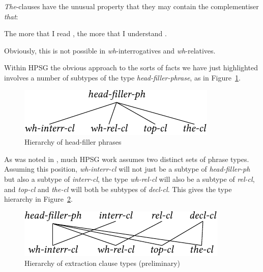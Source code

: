 \documentclass[output=paper
,notxmath 
	        ,collection
	        ,collectionchapter
 	        ,biblatex
                ,babelshorthands
                ,newtxmath
                ,draftmode
                ,colorlinks, citecolor=brown
]{langscibook}
\begin{document}
\noindent
\emph{The}-clauses have the unusual property that they may contain
the complementiser \emph{that}:

\begin{exe}
\ex \label{ex:UDC:46}
The more that I read \trace{}, the more that I understand \trace{}.
\end{exe}

\noindent
Obviously, this is not possible in \emph{wh}-interrogatives and
\emph{wh}-relatives.

\begin{exe} \ex \begin{xlist} \label{ex:UDC:47}

\end{xlist}
\end{exe}

\noindent
Within HPSG the obvious approach to the sorts of facts we have just
highlighted involves a number of subtypes of the type
\emph{head-filler-phrase}, as in Figure~\ref{fig:UDC:48}.


\begin{figure}
  \centering

  \includegraphics{figures/BB-head-fill-hier-crop}
  \caption{\label{fig:UDC:48}Hierarchy of head-filler phrases}
  
\end{figure}


As was noted in , much HPSG work assumes two distinct sets of
phrase types. Assuming this position, \emph{wh-interr-cl} will not just
be a subtype of \emph{head-filler-ph} but also a subtype of
\emph{interr-cl}, the type \emph{wh-rel-cl} will also be a subtype of
\emph{rel-cl}, and \emph{top-cl} and \emph{the-cl} will both be subtypes
of \emph{decl-cl}. This gives the type hierarchy in Figure~\ref{fig:UDC:49}.

\begin{figure}
  \centering

  \includegraphics{figures/BB-extraction-function-hier-crop}
  \caption{\label{fig:UDC:49}Hierarchy of extraction clause types (preliminary)}
  
\end{figure}
\end{document}
